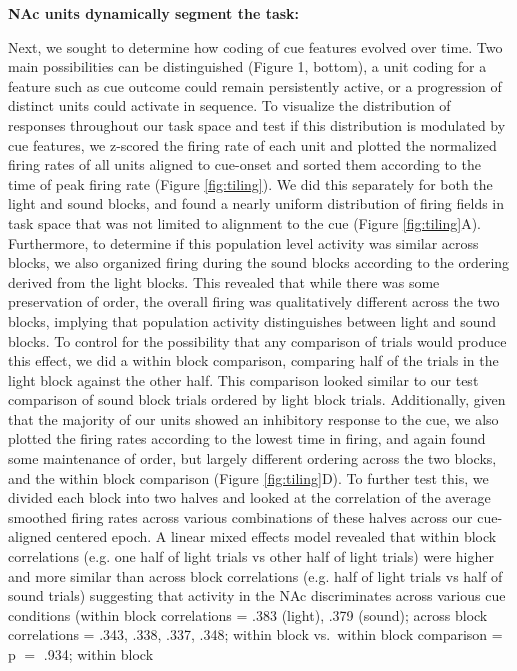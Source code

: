 \documentclass[11pt]{article}
\begin{document}
{\bf NAc units dynamically segment the task:}

Next, we sought to determine how coding of cue features evolved over
time. Two main possibilities can be distinguished (Figure 1, bottom),
a unit coding for a feature such as cue outcome could remain
persistently active, or a progression of distinct units could activate
in sequence. To visualize the distribution of responses throughout our
task space and test if this distribution is modulated by cue features,
we z-scored the firing rate of each unit and plotted the normalized
firing rates of all units aligned to cue-onset and sorted them
according to the time of peak firing rate (Figure
\ref{fig:tiling}). We did this separately for both the light and sound
blocks, and found a nearly uniform distribution of firing fields in
task space that was not limited to alignment to the cue (Figure
\ref{fig:tiling}A). Furthermore, to determine if this population level
activity was similar across blocks, we also organized firing during
the sound blocks according to the ordering derived from the light
blocks. This revealed that while there was some preservation of order,
the overall firing was qualitatively different across the two blocks,
implying that population activity distinguishes between light and
sound blocks. To control for the possibility that any comparison of
trials would produce this effect, we did a within block comparison,
comparing half of the trials in the light block against the other
half. This comparison looked similar to our test comparison of sound
block trials ordered by light block trials. Additionally, given that
the majority of our units showed an inhibitory response to the cue, we
also plotted the firing rates according to the lowest time in firing,
and again found some maintenance of order, but largely different
ordering across the two blocks, and the within block comparison
(Figure \ref{fig:tiling}D). To further test this, we divided each
block into two halves and looked at the correlation of the average
smoothed firing rates across various combinations of these halves
across our cue-aligned centered epoch. A linear mixed effects model
revealed that within block correlations (e.g. one half of light trials
vs other half of light trials) were higher and more similar than
across block correlations (e.g. half of light trials vs half of sound
trials) suggesting that activity in the NAc discriminates across
various cue conditions (within block correlations = .383 (light), .379
(sound); across block correlations = .343, .338, .337, .348; within
block vs.\ within block comparison = p $=$ .934; within block
\end{document}
